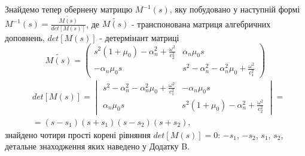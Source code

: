 Знайдемо тепер обернену матрицю $M^{-1}(s)$, яку побудовано у наступній формі $M^{-1}(s) = \frac{\widetilde{M(s)}}{det[M(s)]}$, де $\widetilde{M(s)}$ - транспонована матриця алгебричних доповнень,
$det[M(s)]$ - детермінант матриці
\begin{equation}
    \widetilde{M(s)} = \begin{pmatrix}
        s^2 (1 + \mu_0) -\alpha_n^2 + \frac{\omega^2}{c_2^2} & \alpha_n \mu_0 s \\
        -\alpha_n \mu_0 s & s^2 - \alpha_n^2 - \alpha_n^2\mu_0 + \frac{\omega^2}{c_1^2}
     \end{pmatrix}
\end{equation}
\begin{align}
    &det[M(s)] = \begin{vmatrix}
        s^2 - \alpha_n^2 - \alpha_n^2\mu_0 + \frac{\omega^2}{c_1^2} & -\alpha_n \mu_0 s \\
        \alpha_n \mu_0 s & s^2 (1 + \mu_0) -\alpha_n^2 + \frac{\omega^2}{c_2^2}
     \end{vmatrix} = \nonumber \\
    &=(s - s_1)(s + s_1)(s - s_2)(s + s_2),
\end{align}
знайдено чотири прості корені рівняння $det[M(s)]=0$: $-s_1$, $-s_2$, $s_1$, $s_2$, детальне знаходження яких наведено у Додатку B.

